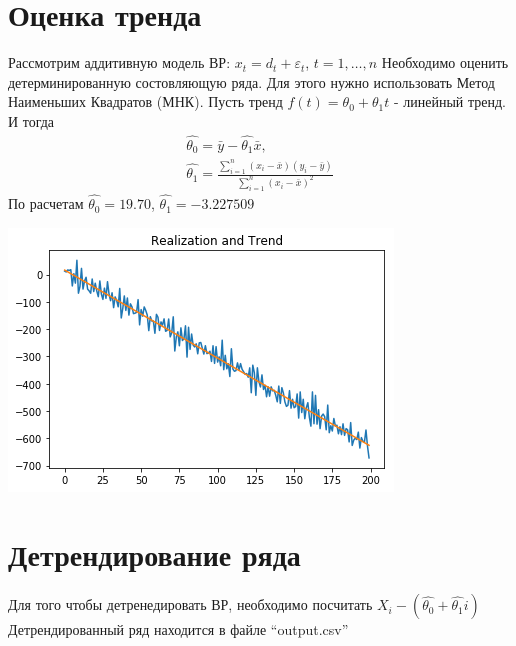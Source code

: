 \documentclass{article}
\begin{document}
\section{Оценка тренда}
Рассмотрим аддитивную модель ВР: $x_t = d_t +\varepsilon_t$, $t=1,\ldots,n$\newline
Необходимо оценить детерминированную состовляющую ряда. Для этого нужно использовать Метод Наименьших Квадратов (МНК).\newline
Пусть тренд $f(t) = \theta_0 + \theta_1t$ - линейный тренд.\newline \newline
И тогда \begin{gather*}
    \hat{\theta_0} = \bar{y} - \hat{\theta_1} \bar{x},\\ 
    \hat{\theta_1} = \frac{\sum_{i=1}^{n}{(x_i - \bar{x})(y_i - \bar{y})}}{\sum_{i=1}^{n}{(x_i - \bar{x})^2}}
\end{gather*}
По расчетам $\hat{\theta_0} = 19.70$, $\hat{\theta_1} = -3.227509$

\includegraphics[width=\linewidth]{trend.png}\newpage

\section{Детрендирование ряда}

Для того чтобы детренедировать ВР, необходимо посчитать $X_i - (\hat{\theta_0} + \hat{\theta_1}i)$\newline
Детрендированный ряд находится в файле ``output.csv''\newline\newline
\end{document}
